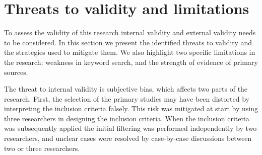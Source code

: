 % 
% 
% 
% 

% 

% 
%
% 

% 
% 
% 

\section{Threats to validity and limitations}

To assess the validity of this research internal validity and external validity
needs to be considered. In this section we present the identified threats to
validity and the strategies used to mitigate them. We also highlight two
specific limitations in the research: weakness in keyword search, and the
strength of evidence of primary sources.

The threat to internal validity is subjective bias, which affects two parts of
the research. First, the selection of the primary studies may have been
distorted by interpreting the inclusion criteria falsely. This risk was
mitigated at start by using three researchers in designing the inclusion
criteria. When the inclusion criteria was subsequently applied the initial
filtering was performed independently by two researchers, and unclear cases were
resolved by case-by-case discussions between two or three researchers.

